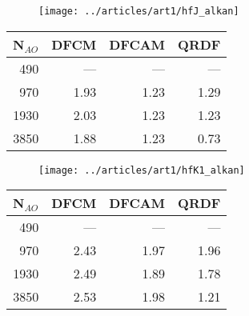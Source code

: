 \begin{figure}[htp]

\begin{subfigure}{\textwidth}
\begin{subfigure}{0.45\textwidth}
\centering
\texttt{[image: ../articles/art1/hfJ\_alkan]}
\end{subfigure}
\hfill
\begin{subtable}{0.45\textwidth}
\centering
\begin{tabular}{rrrr}
\hline
N$_{AO}$ & DFCM & DFCAM & QRDF \\ \hline
490 & --- & --- & --- \\ 
970 & 1.93 & 1.23 & 1.29 \\ 
1930 & 2.03 & 1.23 & 1.23 \\ 
3850 & 1.88 & 1.23 & 0.73 \\ \hline
\end{tabular}
\end{subtable}
\caption{}
\label{fig:GS_DFJSCALE_LA}
\end{subfigure}

\vspace{1.5\baselineskip}

\begin{subfigure}{\textwidth}
\begin{subfigure}{0.45\textwidth}
\centering
\texttt{[image: ../articles/art1/hfK1\_alkan]}
\end{subfigure}
\hfill
\begin{subtable}{0.45\textwidth}
\centering
\begin{tabular}{rrrr}
\hline
N$_{AO}$ & DFCM & DFCAM & QRDF \\ \hline
490 & --- & --- & --- \\ 
970 & 2.43 & 1.97 & 1.96 \\ 
1930 & 2.49 & 1.89 & 1.78 \\ 
3850 & 2.53 & 1.98 & 1.21 \\ \hline
\end{tabular}
\end{subtable}
\caption{}
\label{fig:GS_DFK1SCALE_LA}
\end{subfigure}

\vspace{1.5\baselineskip}


\end{figure}

